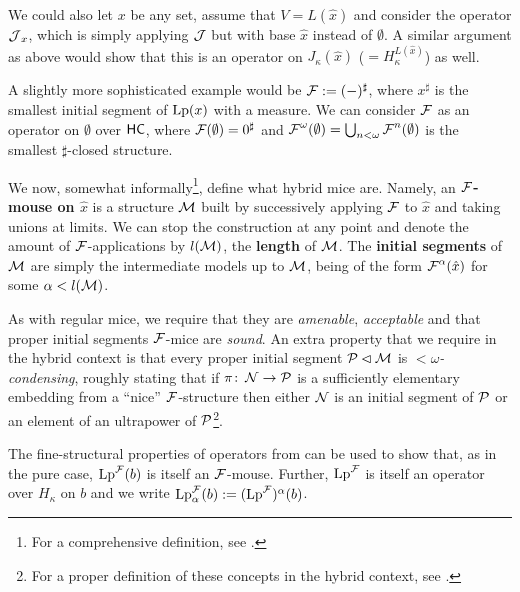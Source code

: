\documentclass[../../main]{subfiles}
\begin{document}
\qquad We could also let $x$ be any set, assume that $V=L(\hat x)$ and consider the operator $\J_x$, which is simply applying $\J$ but with base $\hat x$ instead of $\emptyset$. A similar argument as above would show that this is an operator on $J_\kappa(\hat x)$ ($=H_\kappa^{L(\hat x)}$) as well.

\qquad A slightly more sophisticated example would be $\F := (-)^\sharp$, where $x^\sharp$ is the smallest initial segment of $\lp(x)$ with a measure. We can consider $\F$ as an operator on $\emptyset$ over $\hc$, where $\F(\emptyset) = 0^\sharp$ and $\F^\omega(\emptyset) = \bigcup_{n<\omega}\F^n(\emptyset)$ is the smallest $\sharp$-closed structure.


We now, somewhat informally\footnote{For a comprehensive definition, see \cite[Section 2]{SchlutzenbergTrang}.}, define what hybrid mice are. Namely, an \textbf{$\F$-mouse on $\hat x$} is a structure $\M$ built by successively applying $\F$ to $\hat x$ and taking unions at limits. We can stop the construction at any point and denote the amount of $\F$-applications by $l(\M)$, the \textbf{length} of $\M$. The \textbf{initial segments} of $\M$ are simply the intermediate models up to $\M$, being of the form $\F^\alpha(\hat x)$ for some $\alpha<l(\M)$.

\qquad As with regular mice, we require that they are \textit{amenable}, \textit{acceptable} and that proper initial segments $\F$-mice are \textit{sound}. An extra property that we require in the hybrid context is that every proper initial segment $\P\pinit\M$ is \textit{${<}\omega$-condensing}, roughly stating that if $\pi\colon\N\to\P$ is a sufficiently elementary embedding from a ``nice'' $\F$-structure then either $\N$ is an initial segment of $\P$ or an element of an ultrapower of $\P$\footnote{For a proper definition of these concepts in the hybrid context, see \cite[Section 2]{SchlutzenbergTrang}.}.


The fine-structural properties of operators from \cite{SchlutzenbergTrang} can be used to show that, as in the pure case, $\lp^{\F}(b)$ is itself an $\F$-mouse. Further, $\lp^{\F}$ is itself an operator over $H_\kappa$ on $b$ and we write $\lp^{\F}_\alpha(b) := (\lp^{\F})^\alpha(b)$.
\end{document}
